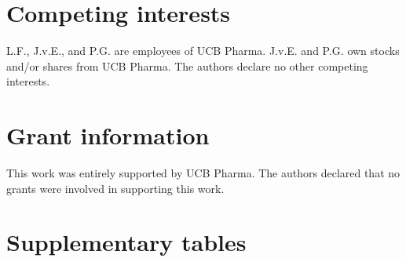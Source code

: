 \documentclass[9pt,a4paper,]{extarticle}
\begin{document}
\hypertarget{competing-interests}{%
\section{Competing interests}\label{competing-interests}}

L.F., J.v.E., and P.G. are employees of UCB Pharma. J.v.E. and P.G. own stocks and/or shares from UCB Pharma. The authors declare no other competing interests.

\hypertarget{grant-information}{%
\section{Grant information}\label{grant-information}}

This work was entirely supported by UCB Pharma. The authors declared that no grants were involved in supporting this work.

\hypertarget{supplementary-tables}{%
\section{Supplementary tables}\label{supplementary-tables}}
\end{document}
